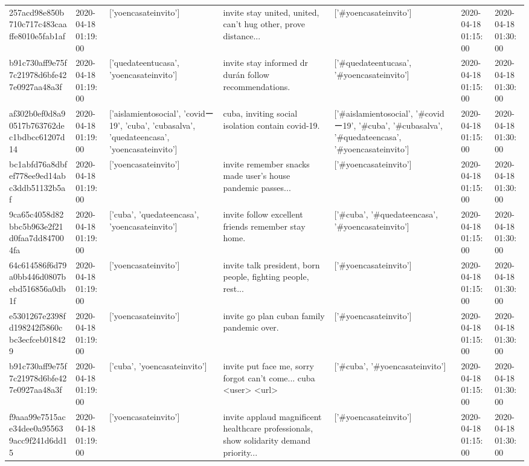 \begin{tabular}{lllllll}
257acd98e850b710c717c483caaffe8010e5fab1af & 2020-04-18 01:19:00 & ['yoencasateinvito'] & invite stay united, united, can't hug other, prove distance... & ['#yoencasateinvito'] & 2020-04-18 01:15:00 & 2020-04-18 01:30:00 \\
b91c730aff9e75f7c21978d6bfe427e0927aa48a3f & 2020-04-18 01:19:00 & ['quedateentucasa', 'yoencasateinvito'] & invite stay informed dr durán follow recommendations. & ['#quedateentucasa', '#yoencasateinvito'] & 2020-04-18 01:15:00 & 2020-04-18 01:30:00 \\
af302b0ef0d8a90517b763762dec1bdbcc61207d14 & 2020-04-18 01:19:00 & ['aislamientosocial', 'covidー19', 'cuba', 'cubasalva', 'quedateencasa', 'yoencasateinvito'] & cuba, inviting social isolation contain covid-19. & ['#aislamientosocial', '#covidー19', '#cuba', '#cubasalva', '#quedateencasa', '#yoencasateinvito'] & 2020-04-18 01:15:00 & 2020-04-18 01:30:00 \\
bc1abfd76a8dbfef778ee9ed14abc3ddb51132b5af & 2020-04-18 01:19:00 & ['yoencasateinvito'] & invite remember snacks made user's house pandemic passes... & ['#yoencasateinvito'] & 2020-04-18 01:15:00 & 2020-04-18 01:30:00 \\
9ca65c4058d82bbc5b963e2f21d0faa7dd847004fa & 2020-04-18 01:19:00 & ['cuba', 'quedateencasa', 'yoencasateinvito'] & invite follow excellent friends remember stay home. & ['#cuba', '#quedateencasa', '#yoencasateinvito'] & 2020-04-18 01:15:00 & 2020-04-18 01:30:00 \\
64c614586f6d79a0bb446d0807bebd516856a0db1f & 2020-04-18 01:19:00 & ['yoencasateinvito'] & invite talk president, born people, fighting people, rest... & ['#yoencasateinvito'] & 2020-04-18 01:15:00 & 2020-04-18 01:30:00 \\
e5301267e2398fd198242f5860cbc3ecfceb018429 & 2020-04-18 01:19:00 & ['yoencasateinvito'] & invite go plan cuban family pandemic over. & ['#yoencasateinvito'] & 2020-04-18 01:15:00 & 2020-04-18 01:30:00 \\
b91c730aff9e75f7c21978d6bfe427e0927aa48a3f & 2020-04-18 01:19:00 & ['cuba', 'yoencasateinvito'] & invite put face me, sorry forgot can't come... cuba <user> <url> & ['#cuba', '#yoencasateinvito'] & 2020-04-18 01:15:00 & 2020-04-18 01:30:00 \\
f9aaa99e7515ace34dee0a955639acc9f241d6dd15 & 2020-04-18 01:19:00 & ['yoencasateinvito'] & invite applaud magnificent healthcare professionals, show solidarity demand priority... & ['#yoencasateinvito'] & 2020-04-18 01:15:00 & 2020-04-18 01:30:00 \\

\end{tabular}
